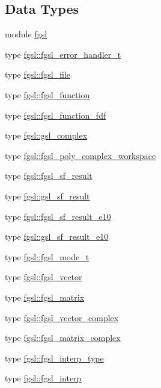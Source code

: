 \subsection*{Data Types}
\begin{DoxyCompactItemize}
\item 
module \hyperlink{classfgsl}{fgsl}
\item 
type \hyperlink{structfgsl_1_1fgsl__error__handler__t}{fgsl\-::fgsl\-\_\-error\-\_\-handler\-\_\-t}
\item 
type \hyperlink{structfgsl_1_1fgsl__file}{fgsl\-::fgsl\-\_\-file}
\item 
type \hyperlink{structfgsl_1_1fgsl__function}{fgsl\-::fgsl\-\_\-function}
\item 
type \hyperlink{structfgsl_1_1fgsl__function__fdf}{fgsl\-::fgsl\-\_\-function\-\_\-fdf}
\item 
type \hyperlink{structfgsl_1_1gsl__complex}{fgsl\-::gsl\-\_\-complex}
\item 
type \hyperlink{structfgsl_1_1fgsl__poly__complex__workspace}{fgsl\-::fgsl\-\_\-poly\-\_\-complex\-\_\-workspace}
\item 
type \hyperlink{structfgsl_1_1fgsl__sf__result}{fgsl\-::fgsl\-\_\-sf\-\_\-result}
\item 
type \hyperlink{structfgsl_1_1gsl__sf__result}{fgsl\-::gsl\-\_\-sf\-\_\-result}
\item 
type \hyperlink{structfgsl_1_1fgsl__sf__result__e10}{fgsl\-::fgsl\-\_\-sf\-\_\-result\-\_\-e10}
\item 
type \hyperlink{structfgsl_1_1gsl__sf__result__e10}{fgsl\-::gsl\-\_\-sf\-\_\-result\-\_\-e10}
\item 
type \hyperlink{structfgsl_1_1fgsl__mode__t}{fgsl\-::fgsl\-\_\-mode\-\_\-t}
\item 
type \hyperlink{structfgsl_1_1fgsl__vector}{fgsl\-::fgsl\-\_\-vector}
\item 
type \hyperlink{structfgsl_1_1fgsl__matrix}{fgsl\-::fgsl\-\_\-matrix}
\item 
type \hyperlink{structfgsl_1_1fgsl__vector__complex}{fgsl\-::fgsl\-\_\-vector\-\_\-complex}
\item 
type \hyperlink{structfgsl_1_1fgsl__matrix__complex}{fgsl\-::fgsl\-\_\-matrix\-\_\-complex}
\item 
type \hyperlink{structfgsl_1_1fgsl__interp__type}{fgsl\-::fgsl\-\_\-interp\-\_\-type}
\item 
type \hyperlink{structfgsl_1_1fgsl__interp}{fgsl\-::fgsl\-\_\-interp}
\item 

\end{DoxyCompactItemize}
